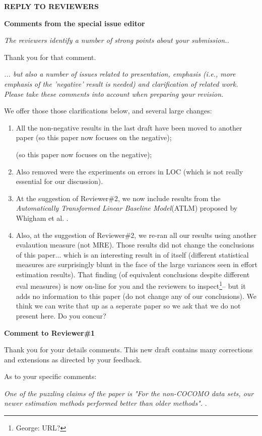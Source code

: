 \documentclass[smallcondesed]{svjour3}
\newcommand{\be}{\begin{enumerate}}
\newcommand{\ee}{\end{enumerate}}
\begin{document}
  
\newpage
\noindent
    {\bf REPLY TO REVIEWERS}

    \noindent
{\bf Comments from the special issue editor}

{\em     The reviewers identify a number of strong points about your submission..}

Thank you for that comment.

{\em ... but also a number of issues related to presentation, emphasis (i.e., more emphasis of the 'negative' result is needed) and clarification of related work. Please take these comments into account when preparing your revision.}

We offer those those clarifications below, and several large changes:

\be
\item All the non-negative results in the last draft have been moved to another paper
  (so this paper now focuses on the negative);

  (so this paper now focuses on the negative);
\item Also removed were the experiments on errors in LOC (which is
  not really essential for our discussion).
  
\item
  At the suggestion of Reviewer\#2, we now include results from the
  \textit{Automatically Transformed Linear Baseline Model}(ATLM) proposed by Whigham et al. \cite{whigham15}.
\item Also, at the suggestion of Reviewer\#2, we re-ran all our results
  using another evalaution measure (not MRE). Those results did not change
  the conclusions of this paper... which is an interesting result in of itself
  (different statistical measures are surprisingly blunt in the face
  of the large variances seen in effort estimation results). That finding (of
  equivalent conclusions despite different eval measures) is now on-line for
  you and the reviewers to inspect\footnote{George: URL?}-- but it adds no information to this
  paper (do not change any of our conclusions). We think we can write
  that up as a seperate paper so we ask that we do not
  present here.  Do you concur?
  \ee
  
\noindent
{\bf Comment to Reviewer\#1}

\noindent
Thank you for your details comments.  This new draft
contains many corrections and extensions as directed by your feedback.

As to your specific comments: 
 
{\em One of the puzzling claims of the paper is "For the non-COCOMO data sets, our newer estimation methods performed better than older methods". }. 
\end{document}
